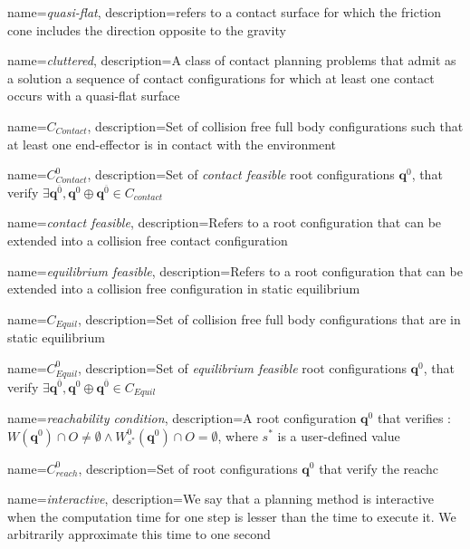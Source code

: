 {
  name=\textit{quasi-flat},
  description={refers to a contact surface for which the friction cone includes the direction opposite to the gravity}
}

{
  name=\textit{cluttered},
  description={A class of contact planning problems that admit as a solution a sequence of contact configurations for which at least one contact occurs with a \gls{quasi-flat} surface}
}

{
  name=$C_{Contact}$,
  description={Set of collision free full body configurations such that at least one end-effector is in contact with the environment}
}

{
  name=$C_{Contact}^0$,
  description={Set of \textit{contact feasible} root configurations $\mathbf{q}^{0}$, that verify $\exists \mathbf{q}^{\overline{0}},  \mathbf{q}^{0} \oplus \mathbf{q}^{\overline{0}} \in C_{contact}$}
}

{
  name=\textit{contact feasible},
  description={Refers to a root configuration that can be extended into a collision free contact configuration}
}

{
  name=\textit{equilibrium feasible},
  description={Refers to a root configuration that can be extended into a collision free configuration in static equilibrium}
}


{
  name=$C_{Equil}$,
  description={Set of collision free full body configurations that are in static equilibrium}
}

{
  name=$C_{Equil}^0$,
  description={Set of \textit{equilibrium feasible} root configurations $\mathbf{q}^{0}$, that verify $\exists \mathbf{q}^{\overline{0}},  \mathbf{q}^{0} \oplus \mathbf{q}^{\overline{0}} \in C_{Equil}$}
}

{
  name=\textit{reachability condition},
  description={A root configuration $\mathbf{q}^{0}$ that verifies :\\ $W(\mathbf{q}^{0}) \cap O \neq \emptyset \wedge W^0_{s^*}(\mathbf{q}^{0}) \cap O = \emptyset$,
  where $s^*$ is a user-defined value}
}

{
  name=$C_{reach}^0$,
  description={Set of root configurations  $\mathbf{q}^{0}$ that verify the \gls{reachc}}
}

{
  name=\textit{interactive},
  description={We say that a planning method is interactive when the computation time for one step is lesser than the
time to execute it. We arbitrarily approximate this time to one second}
}
